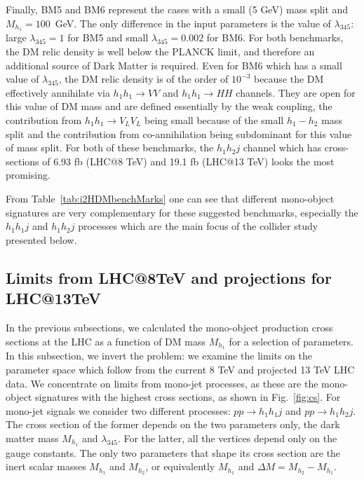 \documentclass[12pt,a4paper]{article}
\begin{document}
Finally, BM5 and BM6 represent the cases with a small (5 GeV) mass split and $M_{h_1}=100$~GeV.
The only difference in the input parameters is the value of $\lambda_{345}$: 
large $\lambda_{345}=1$ for BM5 and small $\lambda_{345}=0.002$ for BM6.
For both benchmarks, the DM relic density is well below the PLANCK limit, and therefore an
additional source of Dark Matter is required. Even for BM6 which has a small
value of $\lambda_{345}$, the DM relic density is
of the order of $10^{-3}$ because the DM effectively annihilate via 
$h_1 h_1 \to VV$  and $h_1 h_1 \to HH$ channels.
They are open for this value of DM mass
and are defined essentially by the weak coupling,
the contribution from $h_1 h_1 \to V_L V_L$ being small because of the small $h_1-h_2$ mass split
and the contribution from co-annihilation being subdominant for this value of mass split.
For both of these benchmarks, the $h_1 h_2 j$ channel
which has cross-sections of 6.93 fb (LHC@8 TeV) and 19.1 fb (LHC@13 TeV)
looks the most promising.

From Table~\ref{tab:i2HDMbenchMarks} one can see that different mono-object signatures are 
very complementary for these suggested benchmarks,
especially the $h_1 h_1 j$ and $h_1 h_2 j$ processes which are
the main focus of the collider study presented below.


%
\subsection{Limits from LHC@8TeV and projections for LHC@13TeV}

In the previous subsections, we calculated the mono-object production cross sections at the LHC
as a function of DM mass $M_{h_1}$ for a selection of parameters.
In this subsection, we invert the problem: we examine the limits on the parameter space which follow 
from the current 8 TeV and projected 13 TeV LHC data. 
We concentrate on limits from mono-jet processes, as these are the mono-object signatures
with the highest cross sections, as shown in Fig.~\ref{fig:cs}.
For mono-jet signals we consider two different processes: $pp\rightarrow h_1h_1j$ and $pp\rightarrow h_1h_2j$.
The cross section of the former depends on the two parameters only, the dark matter mass $M_{h_1}$ and $\lambda_{345}$. 
For the latter, all the vertices depend only on the gauge constants. The only two parameters that shape its cross section 
are the inert scalar masses $M_{h_1}$ and $M_{h_2}$, or equivalently $M_{h_1}$ and $\Delta M = M_{h_2} - M_{h_1}$. 
\end{document}
